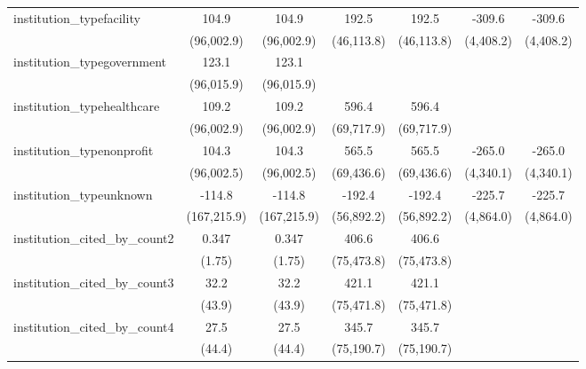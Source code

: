 \begin{tabular}{lcccccc}
   institution\_typefacility             & 104.9        & 104.9        & 192.5       & 192.5       & -309.6        & -309.6\\   
                                         & (96,002.9)   & (96,002.9)   & (46,113.8)  & (46,113.8)  & (4,408.2)     & (4,408.2)\\   
   institution\_typegovernment           & 123.1        & 123.1        &             &             &               &   \\   
                                         & (96,015.9)   & (96,015.9)   &             &             &               &   \\   
   institution\_typehealthcare           & 109.2        & 109.2        & 596.4       & 596.4       &               &   \\   
                                         & (96,002.9)   & (96,002.9)   & (69,717.9)  & (69,717.9)  &               &   \\   
   institution\_typenonprofit            & 104.3        & 104.3        & 565.5       & 565.5       & -265.0        & -265.0\\   
                                         & (96,002.5)   & (96,002.5)   & (69,436.6)  & (69,436.6)  & (4,340.1)     & (4,340.1)\\   
   institution\_typeunknown              & -114.8       & -114.8       & -192.4      & -192.4      & -225.7        & -225.7\\   
                                         & (167,215.9)  & (167,215.9)  & (56,892.2)  & (56,892.2)  & (4,864.0)     & (4,864.0)\\   
   institution\_cited\_by\_count2        & 0.347        & 0.347        & 406.6       & 406.6       &               &   \\   
                                         & (1.75)       & (1.75)       & (75,473.8)  & (75,473.8)  &               &   \\   
   institution\_cited\_by\_count3        & 32.2         & 32.2         & 421.1       & 421.1       &               &   \\   
                                         & (43.9)       & (43.9)       & (75,471.8)  & (75,471.8)  &               &   \\   
   institution\_cited\_by\_count4        & 27.5         & 27.5         & 345.7       & 345.7       &               &   \\   
                                         & (44.4)       & (44.4)       & (75,190.7)  & (75,190.7)  &               &   \\   

\end{tabular}
